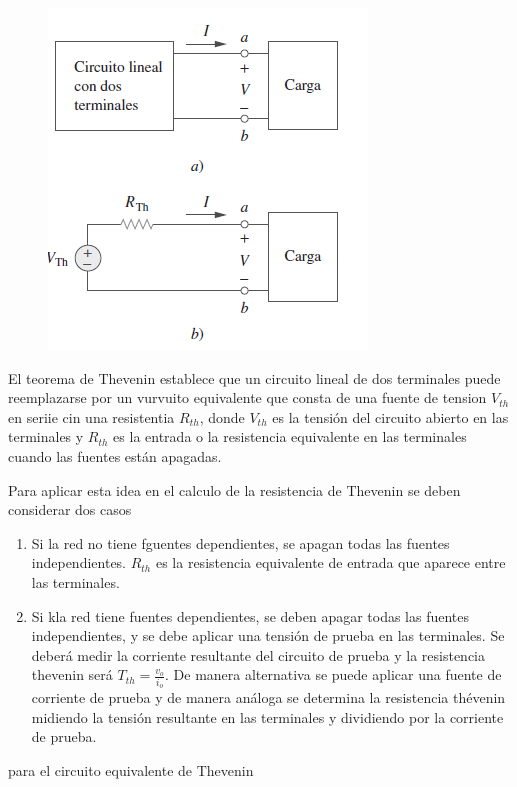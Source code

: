 \begin{figure}[H]
    \centering
    \includegraphics[scale=0.5]{Elect_circ/fig_circequiv.png}
\end{figure}

El teorema de Thevenin establece que un circuito lineal de dos terminales puede reemplazarse por un vurvuito equivalente que consta de una fuente de tension $V_{th}$ en seriie cin una resistentia $R_{th}$, donde $V_{th}$ es la tensión del circuito abierto en las terminales y $R_{th}$ es la entrada o la resistencia equivalente en las terminales cuando las fuentes están apagadas.

Para aplicar esta idea en el calculo de la resistencia de Thevenin se deben considerar dos casos

\begin{enumerate}
    \item Si la red no tiene fguentes dependientes, se apagan todas las fuentes independientes. $R_{th}$ es la resistencia equivalente de entrada que aparece entre las terminales.
    \item Si kla red tiene fuentes dependientes, se deben apagar todas las fuentes independientes, y se debe aplicar una tensión de prueba en las terminales. Se deberá medir la corriente resultante del circuito de prueba y la resistencia thevenin será $T_{th} = \frac{v_o}{i_o}$. De manera alternativa se puede aplicar una fuente de corriente de prueba y de manera análoga se determina la resistencia thévenin midiendo la tensión resultante en las terminales y dividiendo por la corriente de prueba.
\end{enumerate}

para el circuito equivalente de Thevenin 

